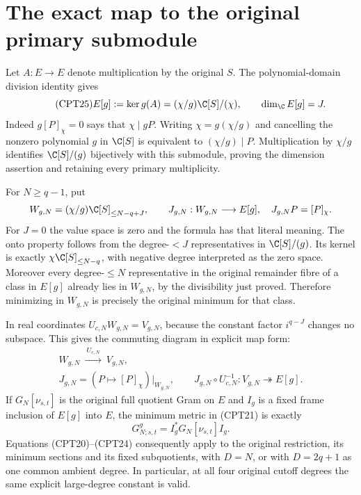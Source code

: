 \documentclass[11pt,a4paper]{article}
\begin{document}
\section{The exact map to the original primary submodule}

Let \(A:E\to E\) denote multiplication by the original \(S\).
The polynomial-domain division identity gives
\begin{equation}\tag{CPT25}
 E[g]:=\ker g(A)=(\chi/g)\C[S]/(\chi),\qquad
 \dim_\C E[g]=J.
\end{equation}
Indeed \(g[P]_\chi=0\) says that \(\chi\mid gP\).
Writing \(\chi=g(\chi/g)\) and cancelling the nonzero polynomial
\(g\) in \(\C[S]\) is equivalent to \((\chi/g)\mid P\).
Multiplication by \(\chi/g\) identifies
\(\C[S]/(g)\) bijectively with this submodule, proving the
dimension assertion and retaining every primary multiplicity.

For \(N\ge q-1\), put
\[
 W_{g,N}=(\chi/g)\C[S]_{\le N-q+J},\qquad
 J_{g,N}:W_{g,N}\longrightarrow E[g],\quad
 J_{g,N}P=[P]_\chi.
\]
For \(J=0\) the value space is zero and the formula has that
literal meaning.  The onto property follows from the
degree-\(<J\) representatives in \(\C[S]/(g)\).
Its kernel is exactly \(\chi\C[S]_{\le N-q}\), with negative
degree interpreted as the zero space.  Moreover every
degree-\(\le N\) representative in the original remainder fibre
of a class in \(E[g]\) already lies in \(W_{g,N}\), by the
divisibility just proved.  Therefore minimizing in \(W_{g,N}\)
is precisely the original minimum for that class.

In real coordinates \(U_{c,N}W_{g,N}=V_{g,N}\), because the
constant factor \(i^{q-J}\) changes no subspace.  This gives the
commuting diagram in explicit map form:
\begin{equation}\tag{CPT26}
\begin{gathered}
 W_{g,N}\ \xrightarrow{\ U_{c,N}\ }\ V_{g,N},\\
 J_{g,N}
 =\left(P\longmapsto[P]_\chi\right)\big|_{W_{g,N}},
 \qquad
 J_{g,N}\circ U_{c,N}^{-1}:V_{g,N}\twoheadrightarrow E[g].
\end{gathered}
\end{equation}
If \(G_N[\nu_{s,t}]\) is the original full quotient Gram on \(E\)
and \(I_g\) is a fixed frame inclusion of \(E[g]\) into \(E\),
the minimum metric in (CPT21) is exactly
\begin{equation}\tag{CPT27}
 G^{g}_{N;s,t}=I_g^*G_N[\nu_{s,t}]I_g.
\end{equation}
Equations (CPT20)--(CPT24) consequently apply to the original
restriction, its minimum sections and its fixed subquotients,
with \(D=N\), or with \(D=2q+1\) as one common ambient degree.
In particular, at all four original cutoff degrees the same
explicit large-degree constant is valid.
\end{document}
